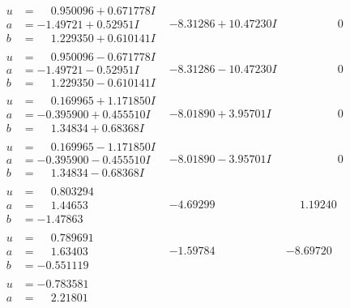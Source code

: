 \documentclass[1p]{elsarticle_modified}
\theoremstyle{definition}
\begin{document}
$$\begin{array}{c|c|c}
\begin{aligned}
u &= \phantom{-}0.950096 + 0.671778 I \\
a &= -1.49721 + 0.52951 I \\
b &= \phantom{-}1.229350 + 0.610141 I\end{aligned}
 & -8.31286 + 10.47230 I & \phantom{-0.000000 } 0 \\ \hline\begin{aligned}
u &= \phantom{-}0.950096 - 0.671778 I \\
a &= -1.49721 - 0.52951 I \\
b &= \phantom{-}1.229350 - 0.610141 I\end{aligned}
 & -8.31286 - 10.47230 I & \phantom{-0.000000 } 0 \\ \hline\begin{aligned}
u &= \phantom{-}0.169965 + 1.171850 I \\
a &= -0.395900 + 0.455510 I \\
b &= \phantom{-}1.34834 + 0.68368 I\end{aligned}
 & -8.01890 + 3.95701 I & \phantom{-0.000000 } 0 \\ \hline\begin{aligned}
u &= \phantom{-}0.169965 - 1.171850 I \\
a &= -0.395900 - 0.455510 I \\
b &= \phantom{-}1.34834 - 0.68368 I\end{aligned}
 & -8.01890 - 3.95701 I & \phantom{-0.000000 } 0 \\ \hline\begin{aligned}
u &= \phantom{-}0.803294\phantom{ +0.000000I} \\
a &= \phantom{-}1.44653\phantom{ +0.000000I} \\
b &= -1.47863\phantom{ +0.000000I}\end{aligned}
 & -4.69299\phantom{ +0.000000I} & \phantom{-}1.19240\phantom{ +0.000000I} \\ \hline\begin{aligned}
u &= \phantom{-}0.789691\phantom{ +0.000000I} \\
a &= \phantom{-}1.63403\phantom{ +0.000000I} \\
b &= -0.551119\phantom{ +0.000000I}\end{aligned}
 & -1.59784\phantom{ +0.000000I} & -8.69720\phantom{ +0.000000I} \\ \hline\begin{aligned}
u &= -0.783581\phantom{ +0.000000I} \\
a &= \phantom{-}2.21801\phantom{ +0.000000I} \\

\end{aligned}
\end{array}$$
\end{document}
